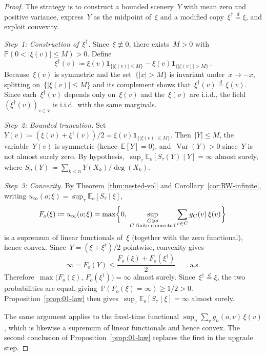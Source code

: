 \documentclass[aop]{imsart}
\theoremstyle{plain}
\theoremstyle{definition}
\newcommand{\E}{\mathbb{E}}
\renewcommand{\P}{\mathbb{P}}
\newcommand{\one}{\mathbf{1}}
\DeclareMathOperator{\var}{Var}
\begin{document}
	\begin{proof}
		The strategy is to construct a bounded scenery~$Y$ with mean zero and positive variance, express~$Y$ as the midpoint of~$\xi$ and a modified copy~$\xi^\dagger\stackrel{d}{=}\xi$, and exploit convexity.
		
		\medskip
		\emph{Step~1: Construction of~$\xi^\dagger$.}\;
		Since~$\xi\not\equiv 0$, there exists~$M>0$ with~$\P(0<|\xi(v)|\leq M)>0$.  Define
		\[
		\xi^\dagger(v)\coloneqq \xi(v)\one_{\{|\xi(v)|\leq M\}}-\xi(v)\one_{\{|\xi(v)|>M\}}\,.
		\]
		Because~$\xi(v)$ is symmetric and the set~$\{|x|>M\}$ is invariant under~$x\mapsto -x$, splitting on~$\{|\xi(v)|\leq M\}$ and its complement shows that~$\xi^\dagger(v)\stackrel{d}{=}\xi(v)$.  Since each~$\xi^\dagger(v)$ depends only on~$\xi(v)$ and the~$\xi(v)$ are i.i.d., the field~$(\xi^\dagger(v))_{v\in V}$ is i.i.d.\ with the same marginals.
		
		\medskip
		\emph{Step~2: Bounded truncation.}\;
		Set~$Y(v)\coloneqq(\xi(v)+\xi^\dagger(v))/2=\xi(v)\one_{\{|\xi(v)|\leq M\}}$.  Then~$|Y|\leq M$, the variable~$Y(v)$ is symmetric (hence~$\E[Y]=0$), and~$\var(Y)>0$ since~$Y$ is not almost surely zero.  By hypothesis,~$\sup_\tau\E_o[S_\tau(Y)\mid Y]=\infty$ almost surely, where $S_n(Y)\coloneqq\sum_{k<n}Y(X_k)/\deg(X_k)$.
		
		\medskip
		\emph{Step~3: Convexity.}\;
		By Theorem~\ref{thm:nested-vol} and Corollary~\ref{cor:RW-infinite}, writing $u_\infty(o;\xi)=\sup_\tau\E_o[S_\tau\mid\xi]$,
		\[
		F_o(\xi)\coloneqq u_\infty(o;\xi)=\max\biggl\{0,\;\sup_{\substack{C\ni o\\ C\textup{ finite connected}}}\sum_{v\in C}g_C(v)\,\xi(v)\biggr\}\,
		\]
		is a supremum of linear functionals of~$\xi$ (together with the zero functional), hence convex.
		Since~$Y=(\xi+\xi^\dagger)/2$ pointwise, convexity gives
		\[
		\infty=F_o(Y)\leq\frac{F_o(\xi)+F_o(\xi^\dagger)}{2}\qquad\text{a.s.}
		\]
		Therefore~$\max\bigl(F_o(\xi),\,F_o(\xi^\dagger)\bigr)=\infty$ almost surely.  Since~$\xi^\dagger\stackrel{d}{=}\xi$, the two probabilities are equal, giving~$\P(F_o(\xi)=\infty)\geq 1/2>0$.  Proposition~\ref{prop:01-law} then gives~$\sup_\tau\E_o[S_\tau\mid\xi]=\infty$ almost surely.
		
		The same argument applies to the fixed-time functional $\sup_n\sum_v g_n(o,v)\,\xi(v)$, which is likewise a supremum of linear functionals and hence convex.  The second conclusion of Proposition~\ref{prop:01-law} replaces the first in the upgrade step.
	\end{proof}
	
\end{document}
